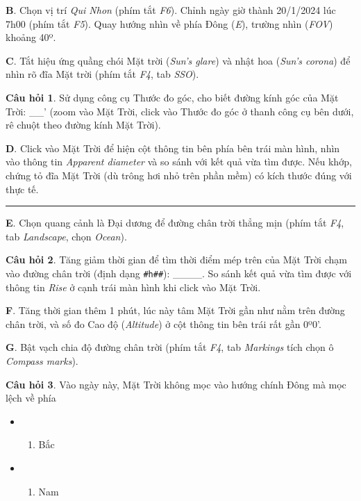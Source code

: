 \documentclass[
  a4paper,
]{book}
\providecommand{\tightlist}{%
  \setlength{\itemsep}{0pt}\setlength{\parskip}{0pt}}
\begin{document}
\textbf{B}. Chọn vị trí \emph{Qui Nhon} (phím tắt \emph{F6}). Chỉnh ngày giờ thành 20/1/2024 lúc 7h00 (phím tắt \emph{F5}). Quay hướng nhìn về phía Đông (\emph{E}), trường nhìn (\emph{FOV}) khoảng 40º.

\textbf{C}. Tắt hiệu ứng quầng chói Mặt trời (\emph{Sun's glare}) và nhật hoa (\emph{Sun's corona}) để nhìn rõ đĩa Mặt trời (phím tắt \emph{F4}, tab \emph{SSO}).

\textbf{Câu hỏi 1}. Sử dụng công cụ Thước đo góc, cho biết đường kính góc của Mặt Trời: \_\_' (zoom vào Mặt Trời, click vào Thước đo góc ở thanh công cụ bên dưới, rê chuột theo đường kính Mặt Trời).

\textbf{D}. Click vào Mặt Trời để hiện cột thông tin bên phía bên trái màn hình, nhìn vào thông tin \emph{Apparent diameter} và so sánh với kết quả vừa tìm được. Nếu khớp, chứng tỏ đĩa Mặt Trời (dù trông hơi nhỏ trên phần mềm) có kích thước đúng với thực tế.

\begin{center}\rule{0.5\linewidth}{0.5pt}\end{center}

\textbf{E}. Chọn quang cảnh là Đại dương để đường chân trời thẳng mịn (phím tắt \emph{F4}, tab \emph{Landscape}, chọn \emph{Ocean}).

\textbf{Câu hỏi 2}. Tăng giảm thời gian để tìm thời điểm mép trên của Mặt Trời chạm vào đường chân trời (định dạng \texttt{\#h\#\#}): \_\_\_\_. So sánh kết quả vừa tìm được với thông tin \emph{Rise} ở cạnh trái màn hình khi click vào Mặt Trời.

\textbf{F}. Tăng thời gian thêm 1 phút, lúc này tâm Mặt Trời gần như nằm trên đường chân trời, và số đo Cao độ (\emph{Altitude}) ở cột thông tin bên trái rất gần 0º0'.

\textbf{G}. Bật vạch chia độ đường chân trời (phím tắt \emph{F4}, tab \emph{Markings} tích chọn ô \emph{Compass marks}).

\textbf{Câu hỏi 3}. Vào ngày này, Mặt Trời không mọc vào hướng chính Đông mà mọc lệch về phía

\begin{itemize}
\tightlist
\item
  \begin{enumerate}
  \def\labelenumi{(\Alph{enumi})}
  \tightlist
  \item
    Bắc\\
  \end{enumerate}
\item
  \begin{enumerate}
  \def\labelenumi{(\Alph{enumi})}
  \setcounter{enumi}{1}
  \tightlist
  \item
    Nam
  \end{enumerate}
\end{itemize}
\end{document}
